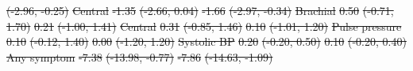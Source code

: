 \documentclass[
  letterpaper,
  DIV=11,
  numbers=noendperiod]{scrartcl}
\makeatletter
\renewenvironment{table}%
   {\renewcommand\familydefault\sfdefault
    \@float{table}}
   {\end@float}
\providecommand{\DIFdel}[1]{{\protect\color{red}\sout{#1}}}                      %
\providecommand{\DIFdelFL}[1]{\DIFdel{#1}} %
\makeatother
\begin{document}
\begin{table}
\DIFdelFL{(-2.96, -0.25)}%
\DIFdelFL{Central }%
\DIFdelFL{-1.35 }%
\DIFdelFL{(-2.66, 0.04) }%
\DIFdelFL{-1.66 }%
\DIFdelFL{(-2.97, -0.34)}%
\DIFdelFL{\hspace{1em} }%
\DIFdelFL{Brachial }%
\DIFdelFL{0.50 }%
\DIFdelFL{(-0.71, 1.70) }%
\DIFdelFL{0.21 }%
\DIFdelFL{(-1.00, 1.41)}%
\DIFdelFL{Central }%
\DIFdelFL{0.31 }%
\DIFdelFL{(-0.85, 1.46) }%
\DIFdelFL{0.10 }%
\DIFdelFL{(-1.01, 1.20)}%
\DIFdelFL{\hspace{1em} }%
\DIFdelFL{Pulse pressure }%
\DIFdelFL{0.10 }%
\DIFdelFL{(-0.12, 1.40) }%
\DIFdelFL{0.00 }%
\DIFdelFL{(-1.20, 1.20)}%
\DIFdelFL{Systolic BP }%
\DIFdelFL{0.20 }%
\DIFdelFL{(-0.20, 0.50) }%
\DIFdelFL{0.10 }%
\DIFdelFL{(-0.20, 0.40)}%
\DIFdelFL{\hspace{1em} }%
\DIFdelFL{Any symptom }%
\DIFdelFL{-7.38 }%
\DIFdelFL{(-13.98, -0.77) }%
\DIFdelFL{-7.86 }%
\DIFdelFL{(-14.63, -1.09)}%

\end{table}
\end{document}
